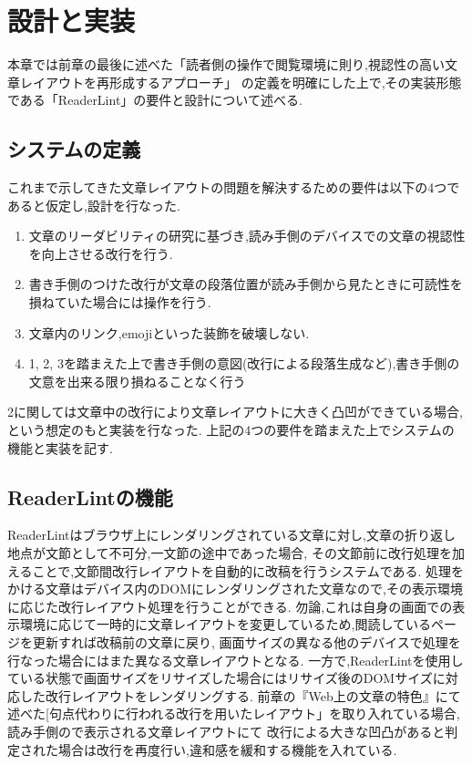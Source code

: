 

\chapter{設計と実装}
\label{chap:system}
本章では前章の最後に述べた「読者側の操作で閲覧環境に則り,視認性の高い文章レイアウトを再形成するアプローチ」
の定義を明確にした上で,その実装形態である「ReaderLint」の要件と設計について述べる.
\newpage

\section{システムの定義}
これまで示してきた文章レイアウトの問題を解決するための要件は以下の4つであると仮定し,設計を行なった.
\begin{enumerate}
	\item 文章のリーダビリティの研究に基づき,読み手側のデバイスでの文章の視認性を向上させる改行を行う.
	\item 書き手側のつけた改行が文章の段落位置が読み手側から見たときに可読性を損ねていた場合には操作を行う.
	\item 文章内のリンク,emojiといった装飾を破壊しない.
	\item 1, 2, 3を踏まえた上で書き手側の意図(改行による段落生成など),書き手側の文意を出来る限り損ねることなく行う
\end{enumerate}
2に関しては文章中の改行により文章レイアウトに大きく凸凹ができている場合,という想定のもと実装を行なった.
上記の4つの要件を踏まえた上でシステムの機能と実装を記す.

\section{ReaderLintの機能}
ReaderLintはブラウザ上にレンダリングされている文章に対し,文章の折り返し地点が文節として不可分,一文節の途中であった場合,
その文節前に改行処理を加えることで,文節間改行レイアウトを自動的に改稿を行うシステムである.
処理をかける文章はデバイス内のDOMにレンダリングされた文章なので,その表示環境に応じた改行レイアウト処理を行うことができる.
勿論,これは自身の画面での表示環境に応じて一時的に文章レイアウトを変更しているため,閲読しているページを更新すれば改稿前の文章に戻り,
画面サイズの異なる他のデバイスで処理を行なった場合にはまた異なる文章レイアウトとなる.
一方で,ReaderLintを使用している状態で画面サイズをリサイズした場合にはリサイズ後のDOMサイズに対応した改行レイアウトをレンダリングする.
前章の『Web上の文章の特色』にて述べた[句点代わりに行われる改行を用いたレイアウト」を取り入れている場合,読み手側ので表示される文章レイアウトにて
改行による大きな凹凸があると判定された場合は改行を再度行い,違和感を緩和する機能を入れている.

